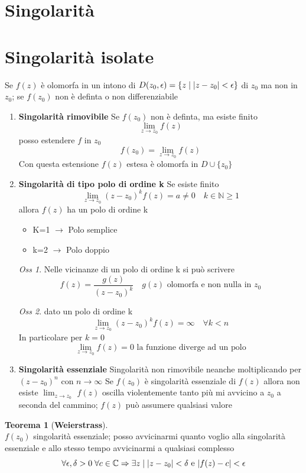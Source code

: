 \documentclass[a4paper,11pt]{report}
\theoremstyle{remark}
\newtheorem*{oss}{Oss}
\theoremstyle{definition}
\newtheorem*{teo}{Teorema}
\newcommand{\C}{\mathbb{C}}
\DeclarePairedDelimiter{\abs}{\lvert}{\rvert}
\begin{document}
\section{Singolarità}
\section*{Singolarità isolate}
Se $f(z)$ è olomorfa in un intono di $D(z_0,\epsilon) =\{z \; | \; \abs{z-z_0}<\epsilon\}$ di $z_0$ ma non in $z_0$; se $f(z_0)$ non è definta o non  differenziabile
\begin{enumerate}
	\item \textbf{Singolarità rimovibile} \newline
	Se $f(z_0)$ non è definta, ma esiste finito 
	\[\lim_{z\to z_0} f(z)\]
	posso estendere $f$ in $z_0$ 
	\[f(z_0) = \lim_{z\to z_0} f(z)\] 
	Con questa estensione $f(z)$ estesa è olomorfa in $D \cup \{z_0\}$
	\item \textbf{Singolarità di tipo polo di ordine k} \newline
	Se esiste finito
	\[\lim_{z\to z_0} {(z-z_0)}^kf(z) = a \ne 0 \quad k \in \mathbb{N}\geq 1\]
	allora $f(z)$ ha un polo di ordine k
	\begin{itemize}
		\item K=1 $\rightarrow$ Polo semplice
		\item k=2 $\rightarrow$ Polo doppio
	\end{itemize}
	\begin{oss}
		Nelle vicinanze di un polo di ordine k si può scrivere 
		\[f(z) = \frac{g(z)}{{(z-z_0)}^k} \quad g(z) \text{ olomorfa e non nulla in } z_0\]
	\end{oss}
	\begin{oss}
		dato un polo di ordine k
		\[\lim_{z\to z_0} {(z-z_0)}^kf(z) = \infty \quad \forall k < n\]
		In particolare per $k=0$
		\[\lim_{z\to z_0} f(z)=0 \text{ la funzione diverge ad un polo}\]
	\end{oss}
	\item \textbf{Singolarità essenziale} \newline
	Singolarità non rimovibile neanche moltiplicando per ${(z-z_0)}^n$ con $n\to \infty$ \newline
	Se $f(z_0)$ è singolarità essenziale di $f(z)$ allora non esiste $\lim_{z\to z_0}$ \newline
	$f(z)$ oscilla violentemente tanto più mi avvicino a $z_0$ a seconda del cammino; $f(z)$ può assumere qualsiasi valore
\end{enumerate}
\begin{teo}[\textbf{Weierstrass}]\hfil\\
	$f(z_0)$ singolarità essenziale; posso avvicinarmi quanto voglio alla singolarità essenziale e allo stesso tempo avvicinarmi a qualsiasi complesso
	\[\forall \epsilon,\delta>0 \; \forall c \in \C \Rightarrow \exists z \; | \; \abs{z-z_0}<\delta \text{ e } \abs{f(z)-c}<\epsilon\]
\end{teo}
\end{document}
